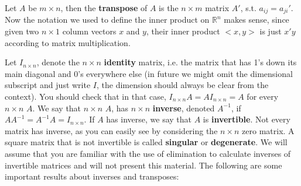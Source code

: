 \documentclass[12pt,oneside]{article}
\begin{document}
Let $A$ be $m \times n$, then the \textbf{transpose} of $A$ is
the $n \times m$ matrix $A'$, s.t. $a_{ij} = a_{ji}'$. Now the
notation we used to define the inner product on ${\mathbb{R}}^n$ makes
sense, since given two $n \times 1$ column vectors $x$ and $y$, their
inner product $<x, y>$ is just $x'y$ according to matrix
multiplication.

Let $I_{n \times n}$, denote the $n \times n$ \textbf{identity}
matrix, i.e. the matrix that has 1's down its main diagonal and 0's
everywhere else (in future we might omit the dimensional subscript and
just write $I$, the dimension should always be clear from the
context). You should check that in that case, $I_{n \times n} A = A
I_{n \times n} = A$ for every $n \times n$ $A$. We say that $n \times
n$ $A$, has $n \times n$ \textbf{inverse}, denoted $A^{-1}$, if $A
A^{-1} = A^{-1} A = I_{n \times n}$.  If $A$ has inverse, we say that
$A$ is \textbf{invertible}. Not every matrix has inverse, as you can
easily see by considering the $n \times n$ zero matrix. A square matrix 
that is not invertible is called \textbf{singular} or \textbf{degenerate}. We 
will assume that you are familiar with the use of elimination to calculate
inverses of invertible matrices and will not present this
material. The following are some important results about inverses and
transposes:
\end{document}
